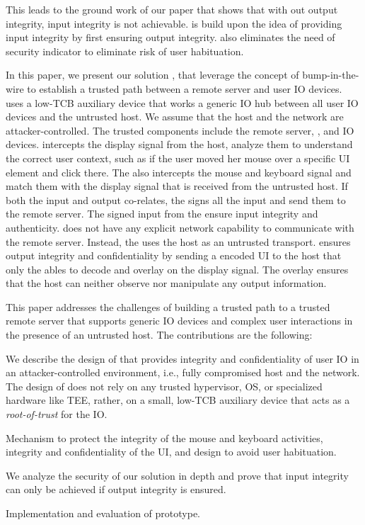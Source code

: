This leads to the ground work of our paper that shows that with out output integrity, input integrity is not achievable. \name is build upon the idea of providing input integrity by first ensuring output integrity. \name also eliminates the need of security indicator to eliminate risk of user habituation. 
 
 In this paper, we present our solution \name, that leverage the concept of bump-in-the-wire to establish a trusted path between a remote server and user IO devices. \name uses a low-TCB auxiliary device that works a generic IO hub between all user IO devices and the untrusted host. We assume that the host and the network are attacker-controlled. The trusted components include the remote server, \device, and IO devices. \device intercepts the display signal from the host, analyze them to understand the correct user context, such as if the user moved her mouse over a specific UI element and click there. The \device also intercepts the mouse and keyboard signal and match them with the display signal that is received from the untrusted host. If both the input and output co-relates, the \device signs all the input and send them to the remote server. The signed input from the \device ensure input integrity and authenticity. \device does not have any explicit network capability to communicate with the remote server. Instead, the \device uses the host as an untrusted transport. \device ensures output integrity and confidentiality by sending a encoded UI to the host that only the \device ables to decode and overlay on the display signal. The overlay ensures that the host can neither observe nor manipulate any output information. 


This paper addresses the challenges of building a trusted path to a trusted remote server that supports generic IO devices and complex user interactions in the presence of an untrusted host. The contributions are the following: 
\begin{mybullet}
  \item We describe the design of \name that provides integrity and confidentiality of user IO in an attacker-controlled environment, i.e., fully compromised host and the network. The design of \name does not rely on any trusted hypervisor, OS, or specialized hardware like TEE, rather, on a small, low-TCB auxiliary device that acts as a \emph{root-of-trust} for the IO.
  \item Mechanism to protect the integrity of the mouse and keyboard activities, integrity and confidentiality of the UI, and design to avoid user habituation. 
  \item We analyze the security of our solution in depth and prove that input integrity can only be achieved if output integrity is ensured.
  \item Implementation and evaluation of \name prototype.
\end{mybullet}

